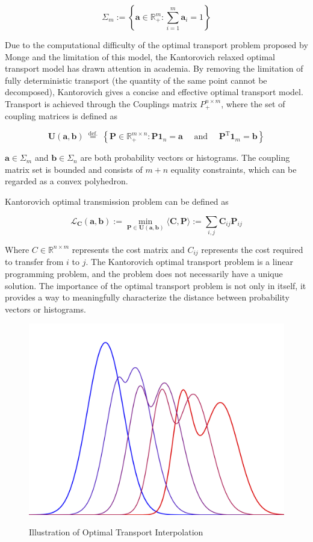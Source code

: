 \begin{equation}
  \Sigma_{m}:=\left\{\mathbf{a} \in \mathbb{R}_{+}^{m}: \sum_{i=1}^{m} \mathbf{a}_{i}=1\right\}
\end{equation}

Due to the computational difficulty of the optimal transport problem proposed by Monge and the limitation of this model, the Kantorovich relaxed optimal transport model has drawn attention in academia. By removing the limitation of fully deterministic transport (the quantity of the same point cannot be decomposed), Kantorovich gives a concise and effective optimal transport model. Transport is achieved through the Couplings matrix $P_+^{n \times m}$, where the set of coupling matrices is defined as

\begin{equation}
  \mathbf{U}(\mathbf{a}, \mathbf{b}) \stackrel{\text { def. }}{=}\left\{\mathbf{P} \in \mathbb{R}_{+}^{m \times n}: \mathbf{P} \mathbf{1}_{n}=\mathbf{a} \quad \text { and } \quad \mathbf{P}^{\mathrm{T}} \mathbf{1}_{m}=\mathbf{b}\right\}
\end{equation}

$\mathbf{a} \in \Sigma_m$ and $\mathbf{b} \in \Sigma_n$ are both probability vectors or histograms. The coupling matrix set is bounded and consists of $m + n$ equality constraints, which can be regarded as a convex polyhedron. 

Kantorovich optimal transmission problem can be defined as

\begin{equation}
  \mathcal{L}_{\mathbf{C}}(\mathbf{a}, \mathbf{b}):=\min _{\mathbf{P} \in \mathbf{U}(\mathbf{a}, \mathbf{b})}\langle\mathbf{C}, \mathbf{P}\rangle:=\sum_{i, j} \mathbf{C}_{i j} \mathbf{P}_{i j}
\end{equation}

Where $C \in \mathbb{R}^{n \times m}$ represents the cost matrix and $C_{ij}$ represents the cost required to transfer from $i$ to $j$. The Kantorovich optimal transport problem is a linear programming problem, and the problem does not necessarily have a unique solution. The importance of the optimal transport problem is not only in itself, it provides a way to meaningfully characterize the distance between probability vectors or histograms.

\vspace{5ex}
\begin{figure}[htbp]
  \centering
  \includegraphics[width=0.8\linewidth]{img/ot}
  \label{fig:ot}
  \caption{Illustration of Optimal Transport Interpolation}
\end{figure}